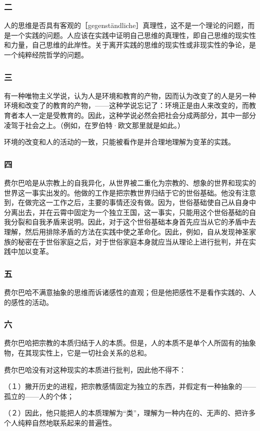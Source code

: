 \documentclass[UTF8,zihao=-4,a4paper]{ctexart}
\begin{document}
\subsubsection*{二}
人的思维是否具有客观的［gegenständliche］真理性，这不是一个理论的问题，而是一个实践的问题。人应该在实践中证明自己思维的真理性，即自己思维的现实性和力量，自己思维的此岸性。关于离开实践的思维的现实性或非现实性的争论，是一个纯粹经院哲学的问题。\par
\subsubsection*{三}
有一种唯物主义学说，认为人是环境和教育的产物，因而认为改变了的人是另一种环境和改变了的教育的产物，——这种学说忘记了：环境正是由人来改变的，而教育者本人一定是受教育的。因此，这种学说必然会把社会分成两部分，其中一部分凌驾于社会之上。（例如，在罗伯特·欧文那里就是如此。）\par
环境的改变和人的活动的一致，只能被看作是并合理地理解为变革的实践。\par
\subsubsection*{四}
费尔巴哈是从宗教上的自我异化，从世界被二重化为宗教的、想象的世界和现实的世界这一事实出发的。他做的工作是把宗教世界归结于它的世俗基础。他没有注意到，在做完这一工作之后，主要的事情还没有做。因为，世俗基础使自己从自身中分离出去，并在云霄中固定为一个独立王国，这一事实，只能用这个世俗基础的自我分裂和自我矛盾来说明。因此，对于这个世俗基础本身首先应当从它的矛盾中去理解，然后用排除矛盾的方法在实践中使之革命化。因此，例如，自从发现神圣家族的秘密在于世俗家庭之后，对于世俗家庭本身就应当从理论上进行批判，并在实践中加以变革。\par
\subsubsection*{五}
费尔巴哈不满意抽象的思维而诉诸感性的直观；但是他把感性不是看作实践的、人的感性的活动。\par
\subsubsection*{六}
费尔巴哈把宗教的本质归结于人的本质。但是，人的本质不是单个人所固有的抽象物，在其现实性上，它是一切社会关系的总和。\par
费尔巴哈没有对这种现实的本质进行批判，因此他不得不：\par
（１）撇开历史的进程，把宗教感情固定为独立的东西，并假定有一种抽象的——孤立的——人的个体；\par
（２）因此，他只能把人的本质理解为“类”，理解为一种内在的、无声的、把许多个人纯粹自然地联系起来的普遍性。\par
\end{document}
